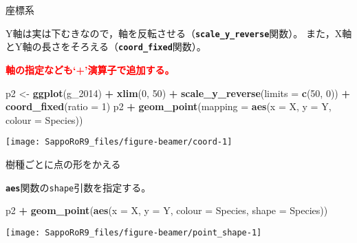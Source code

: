 \documentclass[ignorenonframetext,]{beamer}
\newenvironment{Shaded}{\begin{snugshade}}{\end{snugshade}}
\newcommand{\KeywordTok}[1]{\textcolor[rgb]{0.13,0.29,0.53}{\textbf{#1}}}
\newcommand{\DataTypeTok}[1]{\textcolor[rgb]{0.13,0.29,0.53}{#1}}
\newcommand{\DecValTok}[1]{\textcolor[rgb]{0.00,0.00,0.81}{#1}}
\newcommand{\StringTok}[1]{\textcolor[rgb]{0.31,0.60,0.02}{#1}}
\newcommand{\OperatorTok}[1]{\textcolor[rgb]{0.81,0.36,0.00}{\textbf{#1}}}
\newcommand{\NormalTok}[1]{#1}
\let\oldShaded\Shaded
\let\endoldShaded\endShaded
\renewenvironment{Shaded}{\footnotesize\oldShaded}{\endoldShaded}
\begin{document}
\begin{frame}[fragile]{座標系}

Y軸は実は下むきなので，軸を反転させる（\textbf{\texttt{scale\_y\_reverse}}関数）。
また，X軸とY軸の長さをそろえる（\textbf{\texttt{coord\_fixed}}関数）。

\textcolor{red}{\bfseries 軸の指定なども`+'演算子で追加する。}

\begin{Shaded}
\begin{Highlighting}[]
\NormalTok{p2 <-}\StringTok{ }\KeywordTok{ggplot}\NormalTok{(g_}\DecValTok{2014}\NormalTok{) }\OperatorTok{+}\StringTok{ }\KeywordTok{xlim}\NormalTok{(}\DecValTok{0}\NormalTok{, }\DecValTok{50}\NormalTok{) }\OperatorTok{+}
\StringTok{  }\KeywordTok{scale_y_reverse}\NormalTok{(}\DataTypeTok{limits =} \KeywordTok{c}\NormalTok{(}\DecValTok{50}\NormalTok{, }\DecValTok{0}\NormalTok{)) }\OperatorTok{+}\StringTok{ }\KeywordTok{coord_fixed}\NormalTok{(}\DataTypeTok{ratio =} \DecValTok{1}\NormalTok{)}
\NormalTok{p2 }\OperatorTok{+}\StringTok{ }\KeywordTok{geom_point}\NormalTok{(}\DataTypeTok{mapping =} \KeywordTok{aes}\NormalTok{(}\DataTypeTok{x =}\NormalTok{ X, }\DataTypeTok{y =}\NormalTok{ Y, }\DataTypeTok{colour =}\NormalTok{ Species))}
\end{Highlighting}
\end{Shaded}

\texttt{[image: SappoRoR9\_files/figure-beamer/coord-1]}

\end{frame}

\begin{frame}[fragile]{樹種ごとに点の形をかえる}

\textbf{\texttt{aes}}関数の\texttt{shape}引数を指定する。

\begin{Shaded}
\begin{Highlighting}[]
\NormalTok{p2 }\OperatorTok{+}\StringTok{ }\KeywordTok{geom_point}\NormalTok{(}\KeywordTok{aes}\NormalTok{(}\DataTypeTok{x =}\NormalTok{ X, }\DataTypeTok{y =}\NormalTok{ Y,}
                    \DataTypeTok{colour =}\NormalTok{ Species, }\DataTypeTok{shape =}\NormalTok{ Species))}
\end{Highlighting}
\end{Shaded}

\texttt{[image: SappoRoR9\_files/figure-beamer/point\_shape-1]}

\end{frame}
\end{document}
